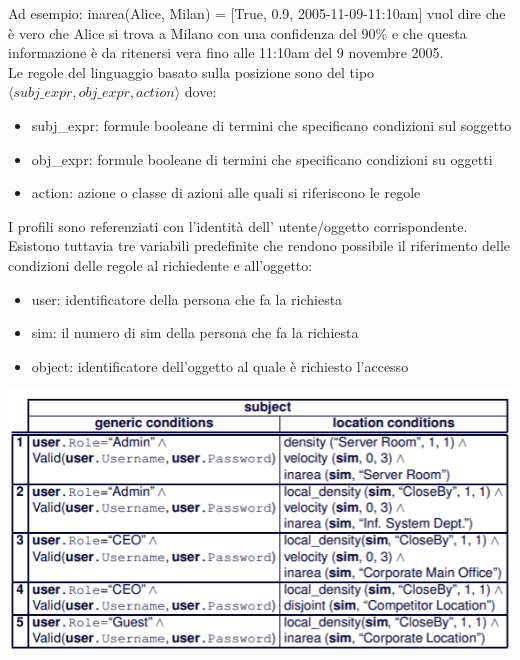 Ad esempio: inarea(Alice, Milan) = [True, 0.9, 2005-11-09-11:10am] vuol dire che è vero che Alice si trova a Milano con una confidenza del 90\% e che questa informazione è da ritenersi vera fino alle 11:10am del 9 novembre 2005.\\
Le regole del linguaggio basato sulla posizione sono del tipo \(\langle subj\_expr, obj\_expr, action\rangle\) dove:
\begin{itemize}
    \item subj\_expr: formule booleane di termini che specificano condizioni sul soggetto
    \item obj\_expr: formule booleane di termini che specificano condizioni su oggetti
    \item action: azione o classe di azioni alle quali si riferiscono le regole
\end{itemize}
I profili sono referenziati con l'identità dell' utente/oggetto corrispondente. Esistono tuttavia tre variabili predefinite che rendono possibile il riferimento delle condizioni delle regole al richiedente e all'oggetto:
\begin{itemize}
    \item user: identificatore della persona che fa la richiesta
    \item sim: il numero di sim della persona che fa la richiesta
    \item object: identificatore dell'oggetto al quale è richiesto l'accesso
\end{itemize}
\begin{center}
    \includegraphics[scale=0.8]{img/locexpress.png}
\end{center}
